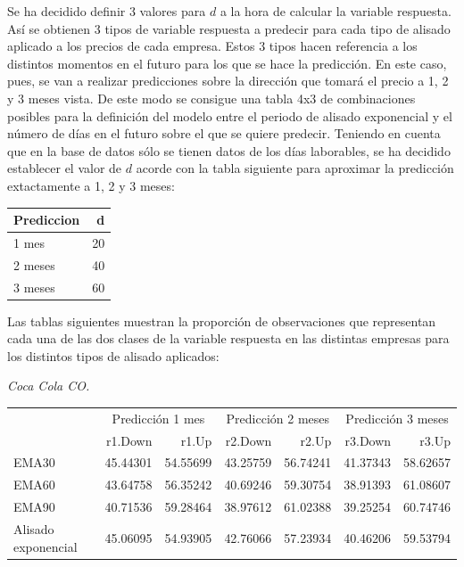 \documentclass[]{DissertateUSU}
\begin{document}
\setlength\parskip{8ex}

\noindent Se ha decidido definir 3 valores para \(d\) a la hora de
calcular la variable respuesta. Así se obtienen 3 tipos de variable
respuesta a predecir para cada tipo de alisado aplicado a los precios de
cada empresa. Estos 3 tipos hacen referencia a los distintos momentos en
el futuro para los que se hace la predicción. En este caso, pues, se van
a realizar predicciones sobre la dirección que tomará el precio a 1, 2 y
3 meses vista. De este modo se consigue una tabla 4x3 de combinaciones
posibles para la definición del modelo entre el periodo de alisado
exponencial y el número de días en el futuro sobre el que se quiere
predecir. Teniendo en cuenta que en la base de datos sólo se tienen
datos de los días laborables, se ha decidido establecer el valor de
\(d\) acorde con la tabla siguiente para aproximar la predicción
extactamente a 1, 2 y 3 meses:

\begin{table}[H]
\centering\begingroup\fontsize{10}{12}\selectfont

\begin{tabular}{l|r}
\hline
Prediccion & d\\
\hline
1 mes & 20\\
\hline
2 meses & 40\\
\hline
3 meses & 60\\
\hline
\end{tabular}
\endgroup{}
\end{table}

\setlength\parskip{7ex}
\justifying

\noindent Las tablas siguientes muestran la proporción de observaciones
que representan cada una de las dos clases de la variable respuesta en
las distintas empresas para los distintos tipos de alisado aplicados:

\emph{Coca Cola CO.}

\setlength\parskip{5ex}
\begin{table}[H]
\centering\begingroup\fontsize{10}{12}\selectfont

\begin{tabular}{l|r|r|r|r|r|r}
\hline
\multicolumn{1}{c|}{ } & \multicolumn{2}{c|}{Predicción 1 mes} & \multicolumn{2}{c|}{Predicción 2 meses} & \multicolumn{2}{c}{Predicción 3 meses} \\
\cline{2-3} \cline{4-5} \cline{6-7}
  & r1.Down & r1.Up & r2.Down & r2.Up & r3.Down & r3.Up\\
\hline
EMA30 & 45.44301 & 54.55699 & 43.25759 & 56.74241 & 41.37343 & 58.62657\\
\hline
EMA60 & 43.64758 & 56.35242 & 40.69246 & 59.30754 & 38.91393 & 61.08607\\
\hline
EMA90 & 40.71536 & 59.28464 & 38.97612 & 61.02388 & 39.25254 & 60.74746\\
\hline
Alisado exponencial & 45.06095 & 54.93905 & 42.76066 & 57.23934 & 40.46206 & 59.53794\\
\hline
\end{tabular}
\endgroup{}
\end{table}
\end{document}
